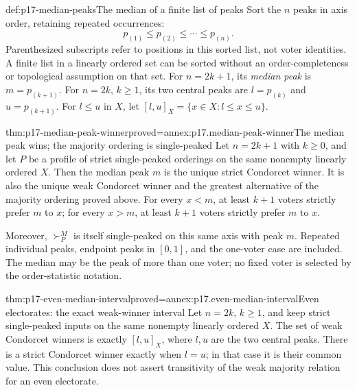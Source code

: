 \begin{hbdefinition}{def:p17-median-peaks}{The median of a finite list of peaks}
Sort the \(n\) peaks in axis order, retaining repeated occurrences:
\[
 p_{(1)}\leq p_{(2)}\leq\cdots\leq p_{(n)}.
\]
Parenthesized subscripts refer to positions in this sorted list, not
voter identities. A finite list in a linearly ordered set can be sorted
without an order-completeness or topological assumption on that set.
For \(n=2k+1\), its \emph{median peak} is \(m=p_{(k+1)}\).
For \(n=2k\), \(k\geq1\), its two central peaks are
\(l=p_{(k)}\) and \(u=p_{(k+1)}\).
For \(l\leq u\) in \(X\), let
\([l,u]_X=\{x\in X:l\leq x\leq u\}\).
\end{hbdefinition}

\begin{hbtheorem}{thm:p17-median-peak-winner}{proved=annex:p17.median-peak-winner}{The median peak wins; the majority ordering is single-peaked}
Let \(n=2k+1\) with \(k\geq0\), and let \(P\) be a profile of
strict single-peaked orderings on the same nonempty linearly ordered
\(X\). Then the median peak \(m\) is the unique strict
Condorcet winner. It is also the unique weak Condorcet winner and the
greatest alternative of the majority ordering proved above.
For every \(x<m\), at least \(k+1\) voters strictly prefer \(m\)
to \(x\); for every \(x>m\), at least \(k+1\) voters strictly
prefer \(m\) to \(x\).

Moreover, \(\succ^M_P\) is itself single-peaked on this same axis
with peak \(m\). Repeated individual peaks, endpoint peaks in
\([0,1]\), and the one-voter case are included. The median may be
the peak of more than one voter; no fixed voter is selected by the
order-statistic notation.
\end{hbtheorem}

\begin{hbtheorem}{thm:p17-even-median-interval}{proved=annex:p17.even-median-interval}{Even electorates: the exact weak-winner interval}
Let \(n=2k\), \(k\geq1\), and keep strict single-peaked inputs
on the same nonempty linearly ordered \(X\). The set of weak Condorcet
winners is exactly \([l,u]_X\), where \(l,u\) are the two central
peaks. There is a strict Condorcet winner exactly when \(l=u\);
in that case it is their common value. This conclusion does not assert
transitivity of the weak majority relation for an even electorate.
\end{hbtheorem}


